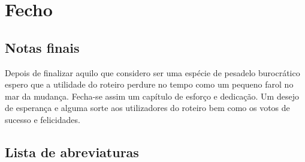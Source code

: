 
\section{Fecho}

\subsection{Notas finais}

Depois de finalizar aquilo que considero ser uma espécie de pesadelo
burocrático espero que a utilidade do roteiro perdure no tempo como um
pequeno farol no mar da mudança. Fecha-se assim um capítulo de esforço e
dedicação. Um desejo de esperança e alguma sorte aos utilizadores do
roteiro bem como os votos de sucesso e felicidades.

\subsection{Lista de abreviaturas}

